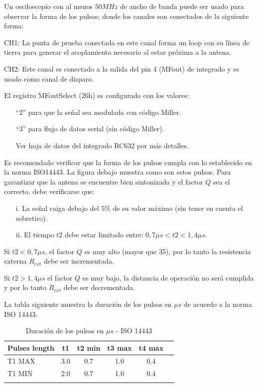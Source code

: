\bigskip
Un osciloscopio con al menos $50MHz$ de ancho de banda puede ser usado para observar la forma de los pulsos; donde los canales son conectados de la siguiente forma:

\bigskip
CH1:   La punta de prueba conectada en este canal forma un loop con su línea de tierra para generar el acoplamiento necesario al estar próxima a la antena.

\bigskip
CH2:   Este canal es conectado a la salida del pin 4 (MFout) de integrado y es usado como canal de disparo.
\bigskip

El registro MFoutSelect (26h) es configurado con los valores:
\begin{itemize}	
\item[]	“2” para que la señal sea modulada con código Miller.
\item[]	“3” para flujo de datos serial (sin código Miller).
\item[]	Ver hoja de datos del integrado RC632 por más detalles.	
\end{itemize}	

Es recomendado verificar que la forma de los pulsos cumpla con lo establecido en la norma ISO14443. La figura debajo muestra como son estos pulsos.
Para garantizar que la antena se encuentre bien sintonizada y el factor $Q$ sea el correcto, debe verificarse que:


\begin{itemize}
\item[i.] La señal caiga debajo del $5\%$ de su valor máximo (sin tener en cuenta el sobretiro).
\item[ii.] El tiempo $t2$ debe estar limitado entre:  $0,7\mu s < t2 < 1,4\mu s$.
\end{itemize}

Si $t2 < 0,7\mu s$, el factor $Q$ es muy alto (mayor que 35), por lo tanto la resistencia externa $R_{ext}$ debe ser incrementada.

\bigskip
Si  $t2 > 1,4\mu s$ el factor $Q$ es muy bajo, la distancia de operación no será cumplida y por lo tanto $R_{ext}$ debe ser decrementada.

\bigskip
La tabla siguiente muestra la duración de los pulsos en $\mu s$ de acuerdo a la norma ISO 14443.

\begin{longtable}{|l|c|c|c|c|r|}
\hline
\multicolumn{1}{|c|}{\textbf{Pulses length}} & \textbf{t1} & \textbf{t2 min} & \textbf{t3 max} & \textbf{t4 max} \\ \hline

T1 MAX 			 &          3.0    &       0.7    &            1.0 &                0.4 \\ \hline
T1 MIN 			 &          2.0    &       0.7    &            1.0 &                0.4 \\ \hline
\caption{Duración de los pulsos en $\mu s$ - ISO 14443}
\label{}
\end{longtable}

